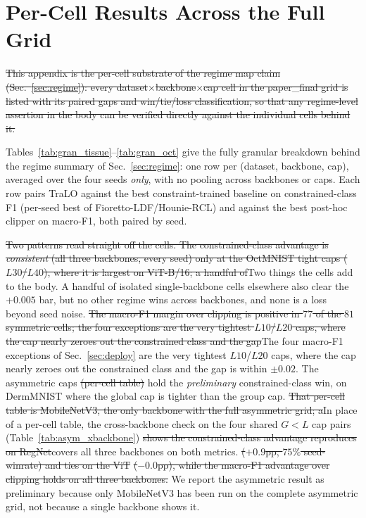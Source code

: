 \documentclass[10pt]{article}
\newcommand{\del}[1]{{\color{red}\sout{#1}}}
\begin{document}
\section{Per-Cell Results Across the Full Grid}
\label{app:regime}

\del{This appendix is the per-cell substrate of the regime map claim
(Sec.~\ref{sec:regime}): every dataset$\times$backbone$\times$cap cell in
the paper\_final grid is listed with its paired gaps and win/tie/loss
classification, so that any regime-level assertion in the body can be
verified directly against the individual cells behind it.}

{\color{blue}}

Tables~\ref{tab:gran_tissue}--\ref{tab:gran_oct} give the fully granular
breakdown behind the regime summary of Sec.~\ref{sec:regime}: one row
per (dataset, backbone, cap), averaged over the four seeds \emph{only},
with no pooling across backbones or caps. Each row pairs TraLO against
the best constraint-trained baseline on constrained-class F1 (per-seed
best of Fioretto-LDF/Hounie-RCL) and against the best post-hoc clipper
on macro-F1, both paired by seed.

\del{Two patterns read straight off the cells. The constrained-class
advantage is \emph{consistent} (all three backbones, every seed) only
at the OctMNIST tight caps ($L30$/$L40$), where it is largest on
ViT-B/16; a handful of}{\color{blue}Two things the cells add to the body.
A handful of} isolated single-backbone cells elsewhere also
clear the $+0.005$ bar, but no other regime wins across backbones, and
none is a loss beyond seed noise. \del{The macro-F1 margin over clipping is
positive in $77$ of the $81$ symmetric cells; the four exceptions are
the very tightest $L10$/$L20$ caps, where the cap nearly zeroes out the
constrained class and the gap}{\color{blue}The four macro-F1 exceptions of
Sec.~\ref{sec:deploy} are the very tightest $L10$/$L20$ caps, where the cap
nearly zeroes out the constrained class and the gap} is within $\pm0.02$. The asymmetric caps
\del{(per-cell table)} hold the \emph{preliminary}
constrained-class win, on DermMNIST where the global cap is tighter
than the group cap. \del{That per-cell table is MobileNetV3, the only
backbone with the full asymmetric grid; a}{\color{blue}In place of a per-cell
table, the} cross-backbone check on the
four shared $G{<}L$ cap pairs (Table~\ref{tab:asym_xbackbone}) \del{shows
the constrained-class advantage reproduces on RegNet}{\color{blue}covers all three
backbones on both metrics.}{\color{blue}\del{Y-400MF}}\del{ ($+0.9$pp, $75\%$
seed-winrate) and ties on the ViT}{\color{blue}\del{-B/16}}\del{ ($-0.0$pp), while the macro-F1
advantage over clipping holds on all three backbones.} We report the
asymmetric result as preliminary because only MobileNetV3 has been run
on the complete asymmetric grid, not because a single backbone shows it.
\end{document}
